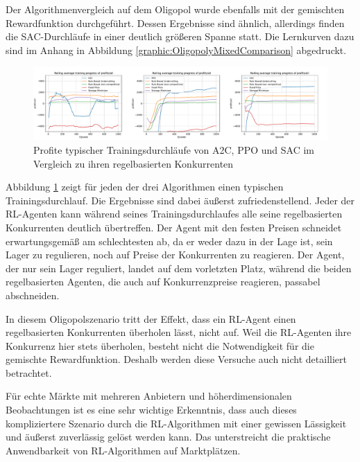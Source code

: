 Der Algorithmenvergleich auf dem Oligopol wurde ebenfalls mit der gemischten Rewardfunktion durchgeführt.
Dessen Ergebnisse sind ähnlich, allerdings finden die SAC-Durchläufe in einer deutlich größeren Spanne statt.
Die Lernkurven dazu sind im Anhang in Abbildung \ref{graphic:OligopolyMixedComparison} abgedruckt.

\begin{figure}[htb]
	\centering
	\includegraphics[width=\textwidth]{main/oligopoly_vendor_comparison.pdf}
	\caption{Profite typischer Trainingsdurchläufe von A2C, PPO und SAC im Vergleich zu ihren regelbasierten Konkurrenten}
	\label{graphic:OligopolyVendorComparison}
\end{figure}

Abbildung \ref{graphic:OligopolyVendorComparison} zeigt für jeden der drei Algorithmen einen typischen Trainingsdurchlauf.
Die Ergebnisse sind dabei äußerst zufriedenstellend.
Jeder der RL-Agenten kann während seines Trainingsdurchlaufes alle seine regelbasierten Konkurrenten deutlich übertreffen.
Der Agent mit den festen Preisen schneidet erwartungsgemäß am schlechtesten ab, da er weder dazu in der Lage ist, sein Lager zu regulieren, noch auf Preise der Konkurrenten zu reagieren.
Der Agent, der nur sein Lager reguliert, landet auf dem vorletzten Platz, während die beiden regelbasierten Agenten, die auch auf Konkurrenzpreise reagieren, passabel abschneiden.

In diesem Oligopolszenario tritt der Effekt, dass ein RL-Agent einen regelbasierten Konkurrenten überholen lässt, nicht auf.
Weil die RL-Agenten ihre Konkurrenz hier stets überholen, besteht nicht die Notwendigkeit für die gemischte Rewardfunktion.
Deshalb werden diese Versuche auch nicht detailliert betrachtet.

Für echte Märkte mit mehreren Anbietern und höherdimensionalen Beobachtungen ist es eine sehr wichtige Erkenntnis, dass auch dieses kompliziertere Szenario durch die RL-Algorithmen mit einer gewissen Lässigkeit und äußerst zuverlässig gelöst werden kann.
Das unterstreicht die praktische Anwendbarkeit von RL-Algorithmen auf Marktplätzen.